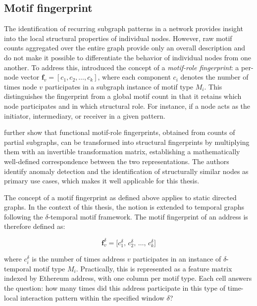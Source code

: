 \documentclass{thesisclass}
\begin{document}
\subsection{Motif fingerprint}
The identification of recurring subgraph patterns in a network provides insight into the local structural properties of individual nodes. However, raw motif counts aggregated over the entire graph provide only an overall description and do not make it possible to differentiate the behavior of individual nodes from one another. To address this, \citet{McDonnell2014} introduced the concept of a \textit{motif-role fingerprint}: a per-node vector $\mathbf{f}_v = [c_1, c_2, \ldots, c_k]$, where each component $c_i$ denotes the number of times node $v$ participates in a subgraph instance of motif type $M_i$. This distinguishes the fingerprint from a global motif count in that it retains which node participates and in which structural role. For instance, if a node acts as the initiator, intermediary, or receiver in a given pattern.

\citet{McDonnell2014} further show that functional motif-role fingerprints, obtained from counts of partial subgraphs, can be transformed into structural fingerprints by multiplying them with an invertible transformation matrix, establishing a mathematically well-defined correspondence between the two representations. The authors identify anomaly detection and the identification of structurally similar nodes as primary use cases, which makes it well applicable for this thesis.

The concept of a motif fingerprint as defined above applies to static directed graphs. In the context of this thesis, the notion is extended to temporal graphs following the $\delta$-temporal motif framework. The motif fingerprint of an address is therefore defined as:

\begin{equation}
    \mathbf{f}_v^{\delta} = \bigl[c_1^{\delta},\, c_2^{\delta},\, \ldots,\, c_k^{\delta}\bigr]
    \label{eq:motif_fingerprint}
\end{equation}

where $c_i^{\delta}$ is the number of times address $v$ participates in an instance of $\delta$-temporal motif type $M_i$. Practically, this is represented as a feature matrix indexed by Ethereum address, with one column per motif type. Each cell answers the question: how many times did this address participate in this type of time-local interaction pattern within the specified window $\delta$?
\end{document}
